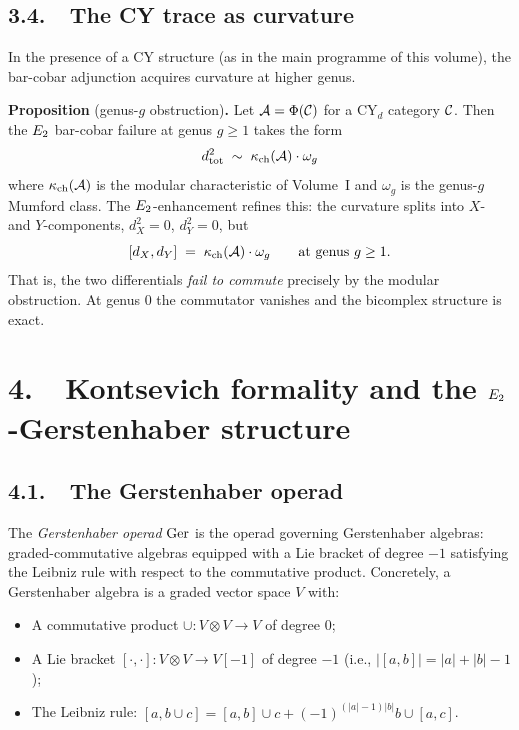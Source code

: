 \subsection*{3.4.\ \ The CY trace as curvature}

In the presence of a CY structure (as in the main programme of this
volume), the bar-cobar adjunction acquires curvature at higher genus.

\medskip
\noindent\textbf{Proposition} (genus-$g$ obstruction)\textbf{.}\;
Let $\mathcal{A} = \Phi(\mathcal{C})$ for a CY$_d$ category $\mathcal{C}$. Then the
$E_2$ bar-cobar failure at genus $g \geq 1$ takes the form
\[
 d_{\mathrm{tot}}^2
 \;\sim\;
 \kappa_{\mathrm{ch}}(\mathcal{A}) \cdot \omega_g
\]
where $\kappa_{\mathrm{ch}}(\mathcal{A})$ is the modular characteristic of Volume~I and
$\omega_g$ is the genus-$g$ Mumford class. The $E_2$-enhancement
refines this: the curvature splits into $X$- and $Y$-components,
$d_X^2 = 0$, $d_Y^2 = 0$, but
\[
 [d_X, d_Y]
 \;=\;
 \kappa_{\mathrm{ch}}(\mathcal{A}) \cdot \omega_g
 \qquad\text{at genus $g \geq 1$}.
\]
That is, the two differentials \emph{fail to commute} precisely by the
modular obstruction. At genus $0$ the commutator vanishes and the
bicomplex structure is exact.



\section*{4.\ \ Kontsevich formality and the $E_2$-Gerstenhaber structure}
\label{note:sec:kontsevich}

\subsection*{4.1.\ \ The Gerstenhaber operad}

The \emph{Gerstenhaber operad} $\mathrm{Ger}$ is the operad governing
Gerstenhaber algebras: graded-commutative algebras equipped with a
Lie bracket of degree $-1$ satisfying the Leibniz rule with respect
to the commutative product. Concretely, a Gerstenhaber algebra is
a graded vector space $V$ with:
\begin{itemize}
 \item A commutative product $\cup\colon V \otimes V \to V$ of
 degree $0$;
 \item A Lie bracket $[\cdot, \cdot]\colon V \otimes V \to V[-1]$
 of degree $-1$ (i.e., $|[a,b]| = |a| + |b| - 1$);
 \item The Leibniz rule:
 $[a, b \cup c] = [a,b] \cup c + (-1)^{(|a|-1)|b|} b \cup [a,c]$.
\end{itemize}

